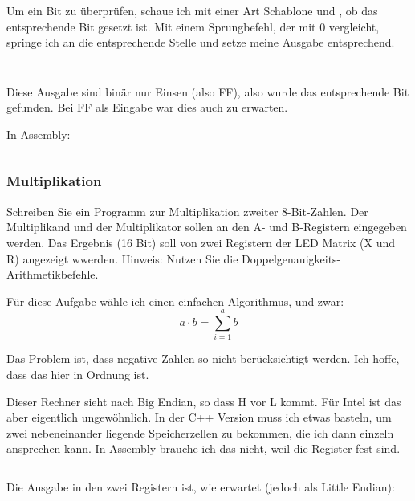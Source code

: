 Um ein Bit zu überprüfen, schaue ich mit einer Art Schablone und \txor, ob das
entsprechende Bit gesetzt ist. Mit einem Sprungbefehl, der mit 0 vergleicht,
springe ich an die entsprechende Stelle und setze meine Ausgabe entsprechend.

\inputminted[fontsize=\small, linenos]{cpp}{../Prototypen/f.cpp}

\begin{multicols}{9}
	\inputminted[fontsize=\footnotesize]{text}{f.txt}
\end{multicols}

Diese Ausgabe sind binär nur Einsen (also FF), also wurde das entsprechende Bit
gefunden. Bei FF als Eingabe war dies auch zu erwarten.

In Assembly:

\inputminted[fontsize=\small, linenos]{python}{../Assembly/f.s}
\subsubsection{Multiplikation}

\begin{problem}
	Schreiben Sie ein Programm zur Multiplikation zweiter 8-Bit-Zahlen. Der
	Multiplikand und der Multiplikator sollen an den A- und B-Registern
	eingegeben werden. Das Ergebnis (16 Bit) soll von zwei Registern der LED
	Matrix (X und R) angezeigt wwerden. Hinweis: Nutzen Sie die
	Doppelgenauigkeits-Arithmetikbefehle.
\end{problem}

Für diese Aufgabe wähle ich einen einfachen Algorithmus, und zwar:
\[
	a \cdot b = \sum_{i = 1}^{a} b
\]

Das Problem ist, dass negative Zahlen so nicht berücksichtigt werden. Ich
hoffe, dass das hier in Ordnung ist.

Dieser Rechner sieht nach Big Endian, so dass H vor L kommt. Für Intel ist das
aber eigentlich ungewöhnlich. In der C++ Version muss ich etwas basteln, um
zwei nebeneinander liegende Speicherzellen zu bekommen, die ich dann einzeln
ansprechen kann. In Assembly brauche ich das nicht, weil die Register fest
sind.

\inputminted[fontsize=\small, linenos]{cpp}{../Prototypen/g.cpp}

Die Ausgabe in den zwei Registern ist, wie erwartet (jedoch als Little Endian):

\begin{multicols}{3}
	\inputminted[fontsize=\footnotesize]{text}{g.txt}
\end{multicols}

